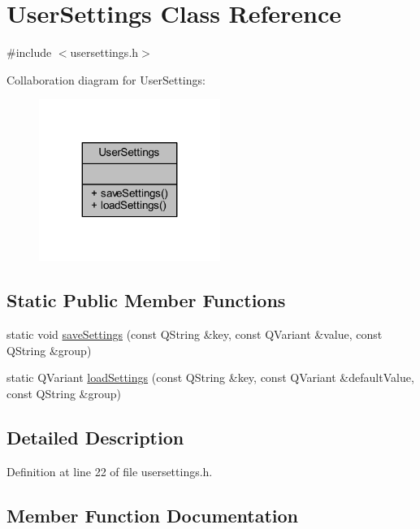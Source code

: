\hypertarget{classUserSettings}{}\section{User\+Settings Class Reference}
\label{classUserSettings}


{\ttfamily \#include $<$usersettings.\+h$>$}



Collaboration diagram for User\+Settings\+:
\nopagebreak
\begin{figure}[H]
\begin{center}
\leavevmode
\includegraphics[width=167pt]{classUserSettings__coll__graph}
\end{center}
\end{figure}
\subsection*{Static Public Member Functions}
\begin{DoxyCompactItemize}
\item 
static void \mbox{\hyperlink{classUserSettings_a0ec1a38cad81b92041d4024a4862c738}{save\+Settings}} (const Q\+String \&key, const Q\+Variant \&value, const Q\+String \&group)
\item 
static Q\+Variant \mbox{\hyperlink{classUserSettings_aa58768206ee548c32bf5f89e1ed8c8ba}{load\+Settings}} (const Q\+String \&key, const Q\+Variant \&default\+Value, const Q\+String \&group)
\end{DoxyCompactItemize}


\subsection{Detailed Description}


Definition at line 22 of file usersettings.\+h.



\subsection{Member Function Documentation}
\mbox{\label{classUserSettings_aa58768206ee548c32bf5f89e1ed8c8ba}} 
